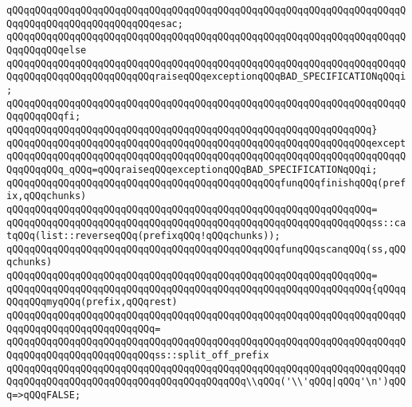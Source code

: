 \verb|qQQqqQQqqQQqqQQqqQQqqQQqqQQqqQQqqQQqqQQqqQQqqQQqqQQqqQQqqQQqqQQqqQQqqQQqqQQqqQQqqQQqqQQqqQQqqQQqesac;|\newline
\verb|qQQqqQQqqQQqqQQqqQQqqQQqqQQqqQQqqQQqqQQqqQQqqQQqqQQqqQQqqQQqqQQqqQQqqQQqqQQqqQQqelse|\newline
\verb|qQQqqQQqqQQqqQQqqQQqqQQqqQQqqQQqqQQqqQQqqQQqqQQqqQQqqQQqqQQqqQQqqQQqqQQqqQQqqQQqqQQqqQQqqQQqqQQqraiseqQQqexceptionqQQqBAD_SPECIFICATIONqQQqi;|\newline
\verb|qQQqqQQqqQQqqQQqqQQqqQQqqQQqqQQqqQQqqQQqqQQqqQQqqQQqqQQqqQQqqQQqqQQqqQQqqQQqqQQqfi;|\newline
\verb|qQQqqQQqqQQqqQQqqQQqqQQqqQQqqQQqqQQqqQQqqQQqqQQqqQQqqQQqqQQqqQQq}|\newline
\verb|qQQqqQQqqQQqqQQqqQQqqQQqqQQqqQQqqQQqqQQqqQQqqQQqqQQqqQQqqQQqqQQqexcept|\newline
\verb|qQQqqQQqqQQqqQQqqQQqqQQqqQQqqQQqqQQqqQQqqQQqqQQqqQQqqQQqqQQqqQQqqQQqqQQqqQQqqQQq_qQQq=qQQqraiseqQQqexceptionqQQqBAD_SPECIFICATIONqQQqi;|\newline
\newline
\verb|qQQqqQQqqQQqqQQqqQQqqQQqqQQqqQQqqQQqqQQqqQQqqQQqfunqQQqfinishqQQq(prefix,qQQqchunks)|\newline
\verb|qQQqqQQqqQQqqQQqqQQqqQQqqQQqqQQqqQQqqQQqqQQqqQQqqQQqqQQqqQQqqQQq=|\newline
\verb|qQQqqQQqqQQqqQQqqQQqqQQqqQQqqQQqqQQqqQQqqQQqqQQqqQQqqQQqqQQqqQQqss::catqQQq(list::reverseqQQq(prefixqQQq!qQQqchunks));|\newline
\newline
\verb|qQQqqQQqqQQqqQQqqQQqqQQqqQQqqQQqqQQqqQQqqQQqqQQqfunqQQqscanqQQq(ss,qQQqchunks)|\newline
\verb|qQQqqQQqqQQqqQQqqQQqqQQqqQQqqQQqqQQqqQQqqQQqqQQqqQQqqQQqqQQqqQQq=|\newline
\verb|qQQqqQQqqQQqqQQqqQQqqQQqqQQqqQQqqQQqqQQqqQQqqQQqqQQqqQQqqQQqqQQq{qQQqqQQqqQQqmyqQQq(prefix,qQQqrest)|\newline
\verb|qQQqqQQqqQQqqQQqqQQqqQQqqQQqqQQqqQQqqQQqqQQqqQQqqQQqqQQqqQQqqQQqqQQqqQQqqQQqqQQqqQQqqQQqqQQqqQQq=|\newline
\verb|qQQqqQQqqQQqqQQqqQQqqQQqqQQqqQQqqQQqqQQqqQQqqQQqqQQqqQQqqQQqqQQqqQQqqQQqqQQqqQQqqQQqqQQqqQQqqQQqss::split_off_prefix|\newline
\newline
\verb|qQQqqQQqqQQqqQQqqQQqqQQqqQQqqQQqqQQqqQQqqQQqqQQqqQQqqQQqqQQqqQQqqQQqqQQqqQQqqQQqqQQqqQQqqQQqqQQqqQQqqQQqqQQqqQQq\\qQQq('\\'qQQq|\verb#|qQQq'\n')qQQq=>qQQqFALSE;#\newline
